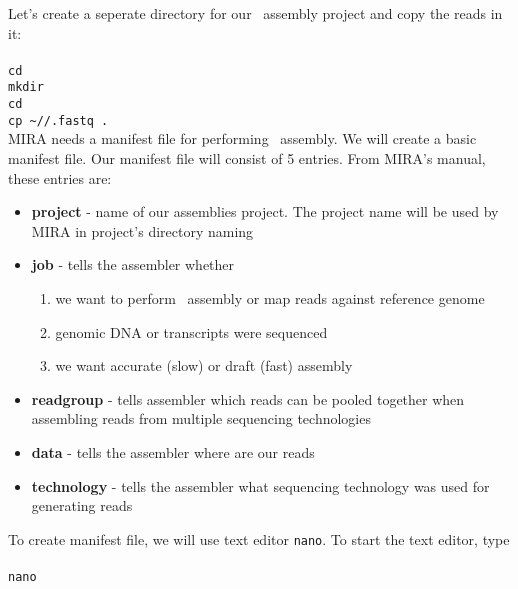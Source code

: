 Let's create a seperate directory for our \denovo~assembly project 
and copy the reads in it:\\~\\
\texttt{cd \workDir}\\
\texttt{mkdir \denovoDir}\\
\texttt{cd \denovoDir}\\
\texttt{cp \textasciitilde/\dataDir/\denovoReads.fastq~.}\\

MIRA needs a manifest file for performing \denovo~assembly.
We will create a basic manifest file. 
Our manifest file will consist of 5 entries. From MIRA's manual, these entries are:
\begin{itemize}
  \item \textbf{project} - name of our assemblies project. The project name will be used by MIRA in project's directory naming
  \item \textbf{job} -  tells the assembler whether
  \begin{enumerate}
    \item we want to perform \denovo~assembly or map reads against reference genome
    \item genomic DNA or transcripts were sequenced
    \item we want accurate (slow) or draft (fast) assembly
  \end{enumerate}
  \item \textbf{readgroup} - tells assembler which reads can be pooled together when assembling reads from multiple sequencing technologies
  \item \textbf{data} - tells the assembler where are our reads
  \item \textbf{technology} - tells the assembler what sequencing technology was used for generating reads
\end{itemize}
To create manifest file, we will use text editor \texttt{nano}. To start the text editor, type \\~\\
\texttt{nano}\\

